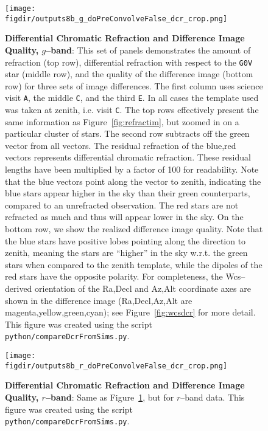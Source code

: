\documentclass[prd, nofootinbib, floatfix, 11pt, tightenlines, times]{article}
\def\figdir{../figures}
\def\A{{\tt A}}
\def\C{{\tt C}}
\def\E{{\tt E}}
\begin{document}
\begin{figure}[h!]
  \centering
  \texttt{[image: \\figdir/outputs8b\_g\_doPreConvolveFalse\_dcr\_crop.png]}
  \caption{{\bf Differential Chromatic Refraction and Difference Image
      Quality, $g$--band}: This set of panels demonstrates the amount
    of refraction (top row), differential refraction with respect to
    the {\tt G0V} star (middle row), and the quality of the difference
    image (bottom row) for three sets of image differences.  The first
    column uses science visit \A, the middle \C, and the third \E.  In
    all cases the template used was taken at zenith, i.e. visit \C.
    The top rows effectively present the same information as
    Figure~\ref{fig:refractim}, but zoomed in on a particular cluster
    of stars.  The second row subtracts off the green vector from all
    vectors.  The residual refraction of the blue,red vectors
    represents differential chromatic refraction.  These residual
    lengths have been multiplied by a factor of 100 for readability.
    Note that the blue vectors point along the vector to zenith,
    indicating the blue stars appear higher in the sky than their
    green counterparts, compared to an unrefracted observation.  The
    red stars are not refracted as much and thus will appear lower in
    the sky.  On the bottom row, we show the realized difference image
    quality.  Note that the blue stars have positive lobes pointing
    along the direction to zenith, meaning the stars are ``higher'' in
    the sky w.r.t. the green stars when compared to the zenith
    template, while the dipoles of the red stars have the opposite
    polarity.  For completeness, the Wcs--derived orientation of the
    Ra,Decl and Az,Alt coordinate axes are shown in the difference
    image (Ra,Decl,Az,Alt are magenta,yellow,green,cyan); see
    Figure~\ref{fig:wcsdcr} for more detail.  This figure was created
    using the script {\tt python/compareDcrFromSims.py}.}
  \label{fig:dcrimg}
\end{figure}

\begin{figure}[h!]
  \centering
  \texttt{[image: \\figdir/outputs8b\_r\_doPreConvolveFalse\_dcr\_crop.png]}
  \caption{{\bf Differential Chromatic Refraction and Difference Image
      Quality, $r$--band}: Same as Figure~\ref{fig:dcrimg}, but for
    $r$--band data.  This figure was created using the script {\tt
      python/compareDcrFromSims.py}.}
  \label{fig:dcrimr}
\end{figure}
\end{document}

